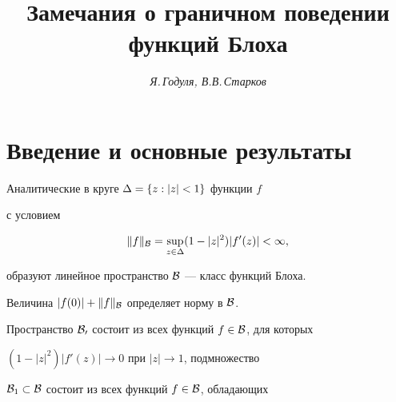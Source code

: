 




\author{\it Я.\,Годуля, В.В.\,Старков}




\title{Замечания о граничном поведении функций Блоха}





\date{}




\pagestyle{plain} %







\maketitle


\label{begin}











\section{Введение и основные результаты}








Аналитические в круге $\Delta=\{z:|z|<1\}$ функции $f$


с условием


$$


\| f\|_{\Bl} =\sup_{z\in\De} (1-|z|^2)|f'(z)|<\infty,


$$


образуют линейное пространство ${\cal B}$ --- класс функций Блоха.


Величина $|f(0)|+\| f\|_{\cal B}$ определяет норму в $\cal B$.





Пространство ${\cal B_0}$ состоит из всех функций $f\in{\cal B}$, для которых


$(1-|z|^2)|f'(z)|\to 0$ при $|z|\to 1$, подмножество


${\cal B}_1\subset{\cal B}$ состоит из всех функций $f\in{\cal B}$, обладающих


